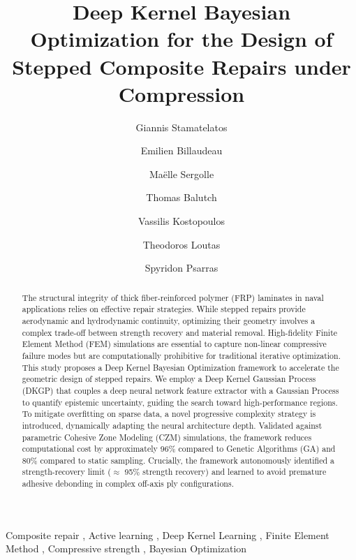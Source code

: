 \documentclass[
  preprint,
  12pt,
  a4paper
]{elsarticle}
\newcommand{\new}[1]{#1}
\begin{document}
\begin{frontmatter}

\title{Deep Kernel Bayesian Optimization for the Design of Stepped Composite Repairs under Compression}


\author[1]{Giannis Stamatelatos}

\author[2]{Emilien Billaudeau}
\author[2]{Maëlle Sergolle}
\author[2]{Thomas Balutch}
\author[1]{Vassilis Kostopoulos}
\author[1]{Theodoros Loutas}
\author[1]{Spyridon Psarras}

\address[1]{Applied Mechanics Laboratory (AML), Department of Mechanical Engineering \& Aeronautics, University of Patras, Patras, Greece}
\address[2]{Naval Group, Centre d'Expertise des Structures et Matériaux Navals, Technocampus Océan, 5 rue de l'Halbran, 4434, France}


\begin{abstract}
The structural integrity of thick fiber-reinforced polymer (FRP) laminates in naval applications relies on effective repair strategies. While stepped repairs provide aerodynamic and hydrodynamic continuity, optimizing their geometry involves a complex trade-off between strength recovery and material removal. High-fidelity Finite Element Method (FEM) simulations are essential to capture non-linear compressive failure modes but are computationally prohibitive for traditional iterative optimization. This study proposes a Deep Kernel Bayesian Optimization framework to accelerate the geometric design of stepped repairs. We employ a Deep Kernel Gaussian Process (DKGP) that couples a deep neural network feature extractor with a Gaussian Process to quantify epistemic uncertainty, guiding the search toward high-performance regions. To mitigate overfitting on sparse data, a novel progressive complexity strategy is introduced, dynamically adapting the neural architecture depth. Validated against parametric Cohesive Zone Modeling (CZM) simulations, the framework reduces computational cost by approximately 96\% compared to Genetic Algorithms (GA) and 80\% compared to static sampling. Crucially, \new{the framework} autonomously identified a \new{strength-recovery limit} ($\approx$ 95\% strength recovery) and learned to avoid premature adhesive debonding in complex off-axis ply configurations.
\end{abstract}

\begin{keyword}
Composite repair \sep 
Active learning \sep 
Deep Kernel Learning \sep 
Finite Element Method \sep 
Compressive strength \sep 
Bayesian Optimization
\end{keyword}

\end{frontmatter}
\end{document}
